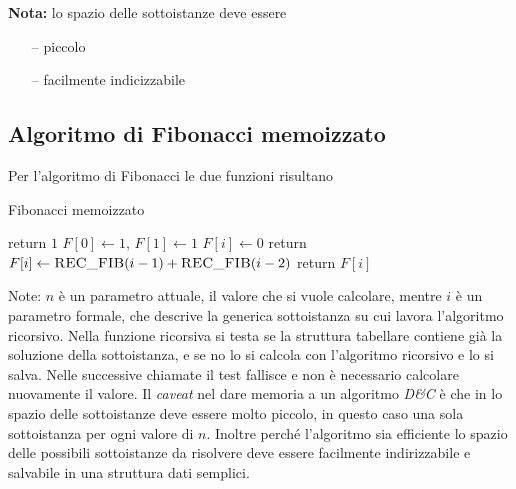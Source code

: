 \textbf{Nota:} lo spazio delle sottoistanze deve essere 
\begin{itemize}[noitemsep,topsep=0pt,parsep=0pt,partopsep=0pt]
    \item[--] piccolo
    \item[--] facilmente indicizzabile
\end{itemize}

\subsection{Algoritmo di Fibonacci memoizzato}

Per l'algoritmo di Fibonacci le due funzioni risultano
\begin{algorithm}[H]
\caption{Fibonacci memoizzato}\label{alg:fibmemoizzato}
\begin{algorithmic}[1]
            \State return $1$
        \EndIf
        \State $F[0] \gets 1$, $F[1] \gets 1$
            \State $F[i] \gets 0$
        \EndFor
        \State return 
    \EndProcedure
            \State $F[i] \gets \Call{REC\_FIB}{i-1} + \Call{REC\_FIB}{i-2} $
        \EndIf
        \State return $F[i]$
    \EndProcedure
\end{algorithmic}
\end{algorithm}
Note:
$n$ è un parametro attuale, il valore che si vuole calcolare, mentre $i$ è un parametro formale, che descrive la generica sottoistanza su cui lavora l'algoritmo ricorsivo.
Nella funzione ricorsiva si testa se la struttura tabellare contiene già la soluzione della sottoistanza, e se no lo si calcola con l'algoritmo ricorsivo e lo si salva. Nelle successive chiamate il test fallisce e non è necessario calcolare nuovamente il valore.
Il \emph{caveat} nel dare memoria a un algoritmo \emph{D\&C} è che in lo spazio delle sottoistanze deve essere molto piccolo, in questo caso una sola sottoistanza per ogni valore di $n$. Inoltre perché l'algoritmo sia efficiente lo spazio delle possibili sottoistanze da risolvere deve essere facilmente indirizzabile e salvabile in una struttura dati semplici.

